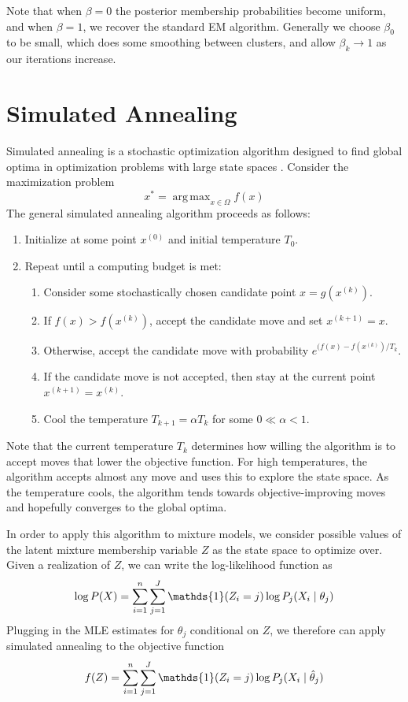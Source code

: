 \documentclass{article}
\DeclareMathOperator*{\argmax}{arg\,max}
\newcommand*{\I}{\mathds{1}}
\newcommand*{\cond}{\;\ifnum\currentgrouptype=16 \middle\fi|\;}
\theoremstyle{definition}
\theoremstyle{algodesc}
\begin{document}
Note that when $\beta = 0$ the posterior membership probabilities become uniform, and when $\beta = 1$, we recover the standard EM algorithm. Generally we choose $\beta_0$ to be small, which does some smoothing between clusters, and allow $\beta_k \to 1$ as our iterations increase.


\section{Simulated Annealing}

Simulated annealing is a stochastic optimization algorithm designed to find global optima in optimization problems with large state spaces \cite{kirkpatrickgelattvecchi83}. Consider the maximization problem
\begin{equation*}
x^* = \argmax_{x \in \Omega} f(x)
\end{equation*}
The general simulated annealing algorithm proceeds as follows:
\begin{enumerate}
\item Initialize at some point $x^{(0)}$ and initial temperature $T_0$.
\item Repeat until a computing budget is met:
  \begin{enumerate}
  \item Consider some stochastically chosen candidate point $x = g(x^{(k)})$.
  \item If $f(x) > f(x^{(k)})$, accept the candidate move and set $x^{(k+1)} = x$.
  \item Otherwise, accept the candidate move with probability $e^{(f(x) - f(x^{(k)})/T_k}$.
  \item If the candidate move is not accepted, then stay at the current point $x^{(k+1)} = x^{(k)}$.
  \item Cool the temperature $T_{k+1} = \alpha T_k$ for some $0 \ll \alpha < 1$.
  \end{enumerate}
\end{enumerate}

Note that the current temperature $T_k$ determines how willing the algorithm is to accept moves that lower the objective function. For high temperatures, the algorithm accepts almost any move and uses this to explore the state space. As the temperature cools, the algorithm tends towards objective-improving moves and hopefully converges to the global optima.

In order to apply this algorithm to mixture models, we consider possible values of the latent mixture membership variable $Z$ as the state space to optimize over. Given a realization of $Z$, we can write the log-likelihood function as
\begin{equation*}
\log P(X) = \sum_{i=1}^n \sum_{j=1}^J \I(Z_i = j) \log P_j(X_i \cond \theta_j)
\end{equation*}
Plugging in the MLE estimates for $\theta_j$ conditional on $Z$, we therefore can apply simulated annealing to the objective function
\begin{equation} \label{eq:sa_obj}
f(Z) = \sum_{i=1}^n \sum_{j=1}^J \I(Z_i = j) \log P_j(X_i \cond \hat{\theta}_j)
\end{equation}
\end{document}
